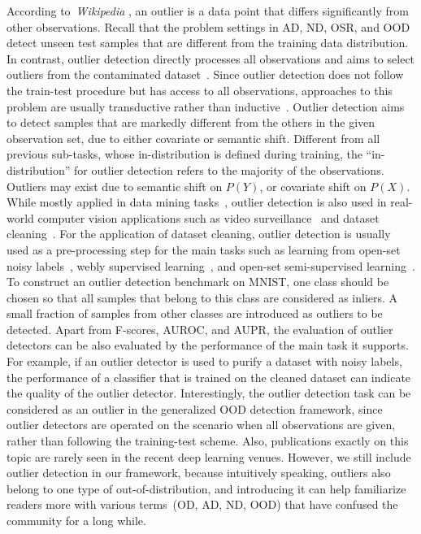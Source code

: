 \label{sec:tax_od}
According to~\emph{Wikipedia} , an outlier is a data point that differs significantly from other observations.
Recall that the problem settings in AD, ND, OSR, and OOD detect unseen test samples that are different from the training data distribution.
In contrast, outlier detection directly processes all observations and aims to select outliers from the contaminated dataset~. Since outlier detection does not follow the train-test procedure but has access to all observations, approaches to this problem are usually transductive rather than inductive~.
\smallskip
{}
Outlier detection aims to detect samples that are markedly different from the others in the given observation set, due to either covariate or semantic shift.
\smallskip
{}
Different from all previous sub-tasks, whose in-distribution is defined during training, the ``in-distribution'' for outlier detection refers to the majority of the observations. Outliers may exist due to semantic shift on $P(Y)$, or covariate shift on $P(X)$.
\smallskip
{}
While mostly applied in data mining tasks~, outlier detection is also used in real-world computer vision applications such as video surveillance~ and dataset cleaning~.
For the application of dataset cleaning, outlier detection is usually used as a pre-processing step for the main tasks such as learning from open-set noisy labels~, webly supervised learning~, and open-set semi-supervised learning~.
To construct an outlier detection benchmark on MNIST, one class should be chosen so that all samples that belong to this class are considered as inliers. A small fraction of samples from other classes are introduced as outliers to be detected. 
\smallskip
{}
Apart from F-scores, AUROC, and AUPR, the evaluation of outlier detectors can be also evaluated by the performance of the main task it supports. For example, if an outlier detector is used to purify a dataset with noisy labels, the performance of a classifier that is trained on the cleaned dataset can indicate the quality of the outlier detector.
\smallskip
{} 
Interestingly, the outlier detection task can be considered as an outlier in the generalized OOD detection framework, since outlier detectors are operated on the scenario when all observations are given, rather than following the training-test scheme. Also, publications exactly on this topic are rarely seen in the recent deep learning venues. However, we still include outlier detection in our framework, because intuitively speaking, outliers also belong to one type of out-of-distribution, and introducing it can help familiarize readers more with various terms~(\eg OD, AD, ND, OOD) that have confused the community for a long while.

